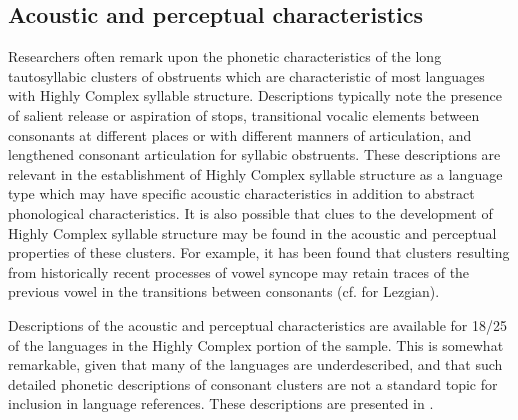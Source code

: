 \subsection{Acoustic and perceptual characteristics}\label{sec:3.4.3}

  Researchers often remark upon the phonetic characteristics of the long tautosyllabic clusters of obstruents which are characteristic of most languages with Highly Complex syllable structure. Descriptions typically note the presence of salient release or aspiration of stops, transitional vocalic elements between consonants at different places or with different manners of articulation, and lengthened consonant articulation for syllabic obstruents. These descriptions are relevant in the establishment of Highly Complex syllable structure as a language type which may have specific acoustic characteristics in addition to abstract phonological characteristics. It is also possible that clues to the development of Highly Complex syllable structure may be found in the acoustic and perceptual properties of these clusters. For example, it has been found that clusters resulting from historically recent processes of vowel syncope may retain traces of the previous vowel in the transitions between consonants (cf. \citealt{ChitoranBabaliyeva2007} for Lezgian).

  Descriptions of the acoustic and perceptual characteristics are available for 18/25 of the languages in the Highly Complex portion of the sample. This is somewhat remarkable, given that many of the languages are underdescribed, and that such detailed phonetic descriptions of consonant clusters are not a standard topic for inclusion in language references. These descriptions are presented in .

